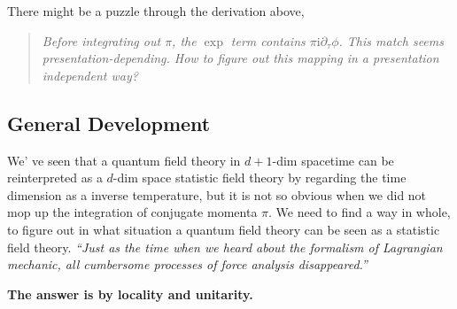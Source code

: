There might be a puzzle through the derivation above, 
\begin{quote}
    \emph{Before integrating out $\pi$, the $\exp$ term contains $\pi \mathrm{i} \partial_{\tau} \phi$. This match seems presentation-depending.
    How to figure out this mapping in a presentation independent way?}
\end{quote}


\subsection{General Development}
We' ve seen that a quantum field theory in $d+1$-dim spacetime can be reinterpreted as a $d$-dim space statistic field theory by regarding the time dimension as a inverse temperature, but it is not so obvious when we did not mop up the integration of conjugate momenta $\pi$. We need to find a way in whole, to figure out in what situation a quantum field theory can be seen as a statistic field theory. \emph{``Just as the time when we heard about the formalism of Lagrangian mechanic, all cumbersome processes of force analysis disappeared.''}

\textbf{The answer is by locality and unitarity.}

